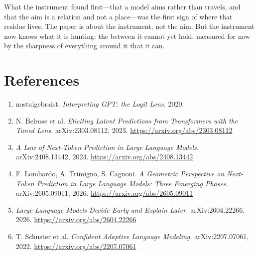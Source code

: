\documentclass[11pt,a4paper]{article}
\begin{document}
What the instrument found first---that a model aims rather than travels, and that the
aim is a relation and not a place---was the first sign of where that residue lives.
The paper is about the instrument, not the aim. But the instrument now knows what it
is hunting: the between it cannot yet hold, measured for now by the sharpness of
everything around it that it can.

\section*{References}
\begin{enumerate}[nosep,leftmargin=1.6em]
\item nostalgebraist. \textit{Interpreting GPT: the Logit Lens.} 2020.
\item N. Belrose et al. \textit{Eliciting Latent Predictions from Transformers with the Tuned Lens.} arXiv:2303.08112, 2023. \url{https://arxiv.org/abs/2303.08112}
\item \textit{A Law of Next-Token Prediction in Large Language Models.} arXiv:2408.13442, 2024. \url{https://arxiv.org/abs/2408.13442}
\item F. Lombardo, A. Trimigno, S. Cagnoni. \textit{A Geometric Perspective on Next-Token Prediction in Large Language Models: Three Emerging Phases.} arXiv:2605.09011, 2026. \url{https://arxiv.org/abs/2605.09011}
\item \textit{Large Language Models Decide Early and Explain Later.} arXiv:2604.22266, 2026. \url{https://arxiv.org/abs/2604.22266}
\item T. Schuster et al. \textit{Confident Adaptive Language Modeling.} arXiv:2207.07061, 2022. \url{https://arxiv.org/abs/2207.07061}
\end{enumerate}
\end{document}
